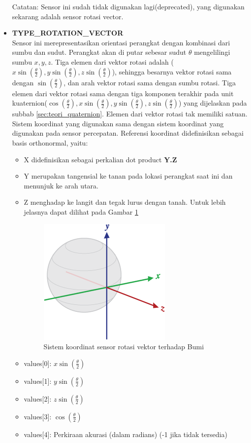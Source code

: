 \begin{itemize}
Catatan: Sensor ini sudah tidak digunakan lagi(deprecated), yang digunakan sekarang adalah sensor rotasi vector.\\
\item \textbf{TYPE\_ROTATION\_VECTOR}\\
Sensor ini merepresentasikan orientasi perangkat dengan kombinasi dari sumbu dan sudut. Perangkat akan di putar sebesar sudut \(\theta\) mengelilingi sumbu \(x,y,z\). Tiga elemen dari vektor rotasi adalah (\(x \sin (\frac{\theta}{2}), y \sin (\frac{\theta}{2}), z \sin (\frac{\theta}{2})\)), sehingga besarnya vektor rotasi sama dengan \(\sin (\frac{\theta}{2})\), dan arah vektor rotasi sama dengan sumbu rotasi. Tiga elemen dari vektor rotasi sama dengan tiga komponen terakhir pada unit kuaternion(\(\cos (\frac{\theta}{2}),x \sin (\frac{\theta}{2}), y \sin (\frac{\theta}{2}), z \sin (\frac{\theta}{2})\)) yang dijelaskan pada subbab \ref{sec:teori_quaternion}. Elemen dari vektor rotasi tak memiliki satuan. Sistem koordinat yang digunakan sama dengan sistem koordinat yang digunakan pada sensor percepatan. Referensi koordinat didefinisikan sebagai basis orthonormal, yaitu:
\begin{itemize}
	\item X didefinisikan sebagai perkalian dot product \textbf{Y.Z}
	\item Y merupakan tangensial ke tanan pada lokasi perangkat saat ini dan menunjuk ke arah utara. 
	\item Z menghadap ke langit dan tegak lurus dengan tanah. Untuk lebih jelasnya dapat dilihat pada Gambar \ref{fig:axis-globe}
	\begin{figure}[htbp]
	\centering
	\includegraphics[scale=1]{Gambar/axis-globe.png}
	\caption{Sistem koordinat sensor rotasi vektor terhadap Bumi} 
	\label{fig:axis-globe}
	\end{figure}
	\item values[0]: \(x \sin (\frac{\theta}{2})\)
	\item values[1]: \(y \sin (\frac{\theta}{2})\)
	\item values[2]: \(z \sin (\frac{\theta}{2})\)
	\item values[3]: \(\cos (\frac{\theta}{2})\)
	\item values[4]: Perkiraan akurasi (dalam radians) (-1 jika tidak tersedia) 
\end{itemize}



\end{itemize}



